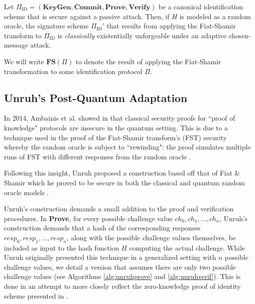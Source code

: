 \begin{tcolorbox}
\begin{theorem}
\label{thm:fiatshamir}
Let $\Pi_{\text{ID}} = (\textbf{KeyGen}, \textbf{Commit}, \textbf{Prove}, \textbf{Verify})$ be a canonical identification scheme that is secure against a passive attack. Then, if $H$ is modeled as a random oracle, the signature scheme $\Pi_{\text{ID}}'$ that results from applying the Fiat-Shamir transform to $\Pi_{\text{ID}}$ is \emph{classically} existentially unforgeable under an adaptive chosen-message attack.
\end{theorem}
\end{tcolorbox}

We will write $\textbf{FS}(\Pi)$ to denote the result of applying the Fiat-Shamir transformation to some identification protocol $\Pi$.

\subsection{Unruh's Post-Quantum Adaptation}

In 2014, Ambainis et al. showed in \cite{rewinding} that classical security proofs for ``proof of knowledge" protocols are insecure in the quantum setting. This is due to a technique used in the proof of the Fiat-Shamir transform's (FST) security whereby the random oracle is subject to ``rewinding": the proof simulates multiple runs of FST with different responses from the random oracle \cite{rewinding}.

Following this insight, Unruh proposed a construction based off that of Fiat \& Shamir which he proved to be secure in both the classical and quantum random oracle models \cite{unruh}.

Unruh's construction demands a small addition to the proof and verification procedures. In \textbf{Prove}, for every possible challenge value $ch_0, ch_1, ... , ch_n$, Unruh's construction demands that a hash of the corresponding responses $resp_0, resp_1, ... , resp_n$, along with the possible challenge values themselves, be included as input to the hash function $H$ computing the actual challenge. While Unruh originally presented this technique in a generalized setting with $n$ possible challenge values, we detail a version that assumes there are only two possible challenge values (see Algorithms \ref{alg:unruhprove} and \ref{alg:unruhverif}). This is done in an attempt to more closely reflect the zero-knowledge proof of identity scheme presented in \cite{djp}.

